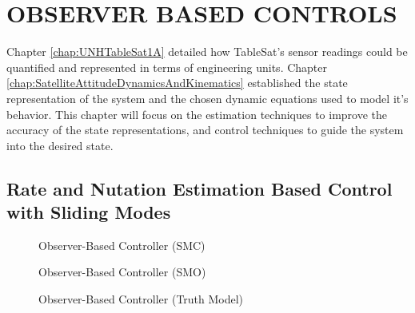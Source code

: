 
\chapter{OBSERVER BASED CONTROLS}
\label{chap:ObserverBasedControls}

Chapter \ref{chap:UNHTableSat1A} detailed how TableSat's sensor readings could be quantified and represented in terms of engineering units.  Chapter \ref{chap:SatelliteAttitudeDynamicsAndKinematics} established the state representation of the system and the chosen dynamic equations used to model it's behavior.  This chapter will focus on the estimation techniques to improve the accuracy of the state representations, and control techniques to guide the system into the desired state.

\section{Rate and Nutation Estimation Based Control with Sliding Modes}
\label{sec:RateandNutationEstimationBasedControllers}

\begin{figure}[H]
  \centerline{}
  \caption{Observer-Based Controller (SMC)}
  \label{fig:ObserverBasedControllerSMC}
\end{figure}

\begin{figure}[H]
  \centerline{}
  \caption{Observer-Based Controller (SMO)}
  \label{fig:ObserverBasedControllerSMO}
\end{figure}

\begin{figure}[H]
  \centerline{}
  \caption{Observer-Based Controller (Truth Model)}
  \label{fig:ObserverBasedControllerTruth}
\end{figure}


